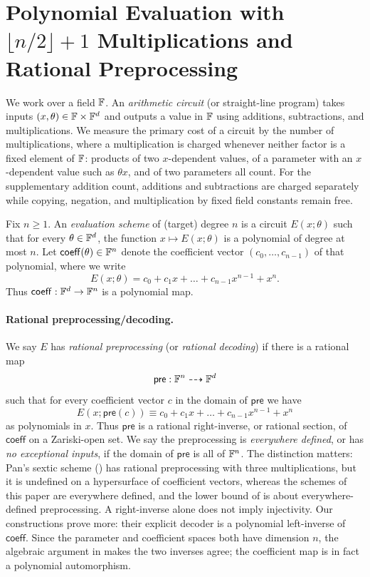 \section{Polynomial Evaluation with \texorpdfstring{$\lfloor n/2\rfloor+1$}{floor(n/2)+1} Multiplications and Rational Preprocessing}
\label{sec:model}

We work over a field $\mathbb{F}$.
An \emph{arithmetic circuit} (or straight-line program) takes inputs $(x,\theta)\in\mathbb{F}\times\mathbb{F}^d$ and outputs a value in $\mathbb{F}$ using additions, subtractions, and multiplications.
We measure the primary cost of a circuit by the number of multiplications,
where a multiplication is charged whenever neither factor is a fixed element
of $\mathbb{F}$: products of two $x$-dependent values, of a parameter with an
$x$-dependent value such as $\theta x$, and of two parameters all count.
For the supplementary addition count, additions and subtractions are charged
separately while copying, negation, and multiplication by fixed field
constants remain free.

Fix $n\ge 1$.
An \emph{evaluation scheme} of (target) degree $n$ is a circuit $E(x;\theta)$ such that for every $\theta\in\mathbb{F}^d$, the function $x\mapsto E(x;\theta)$ is a polynomial of degree at most $n$.
Let $\mathsf{coeff}(\theta)\in\mathbb{F}^n$ denote the coefficient vector $(c_0,\dots,c_{n-1})$ of that polynomial, where we write
\[
E(x;\theta)=c_0 + c_1 x + \dots + c_{n-1}x^{n-1} + x^n.
\]
Thus $\mathsf{coeff}:\mathbb{F}^d\to\mathbb{F}^n$ is a polynomial map.

\paragraph{Rational preprocessing/decoding.}
We say $E$ has \emph{rational preprocessing} (or \emph{rational decoding}) if there is a rational map
\[
\mathsf{pre}:\mathbb{F}^n \dashrightarrow \mathbb{F}^d
\]
such that for every coefficient vector $c$ in the domain of $\mathsf{pre}$ we have
\[
E(x;\mathsf{pre}(c)) \equiv c_0 + c_1 x + \dots + c_{n-1}x^{n-1} + x^n
\]
as polynomials in $x$.
Thus $\mathsf{pre}$ is a rational right-inverse, or rational section, of
$\mathsf{coeff}$ on a Zariski-open set.
We say the preprocessing is \emph{everywhere defined}, or has \emph{no exceptional
inputs}, if the domain of $\mathsf{pre}$ is all of $\mathbb{F}^n$.
The distinction matters: Pan's sextic scheme () has rational
preprocessing with three multiplications, but it is undefined on a hypersurface
of coefficient vectors, whereas the schemes of this paper are everywhere defined,
and the lower bound of  is about everywhere-defined preprocessing.
A right-inverse alone does not imply
injectivity.  Our constructions prove more: their explicit decoder is a
polynomial left-inverse of $\mathsf{coeff}$.  Since the parameter and
coefficient spaces both have dimension $n$, the algebraic argument in
 makes the two inverses agree;
the coefficient map is in fact a polynomial automorphism.

